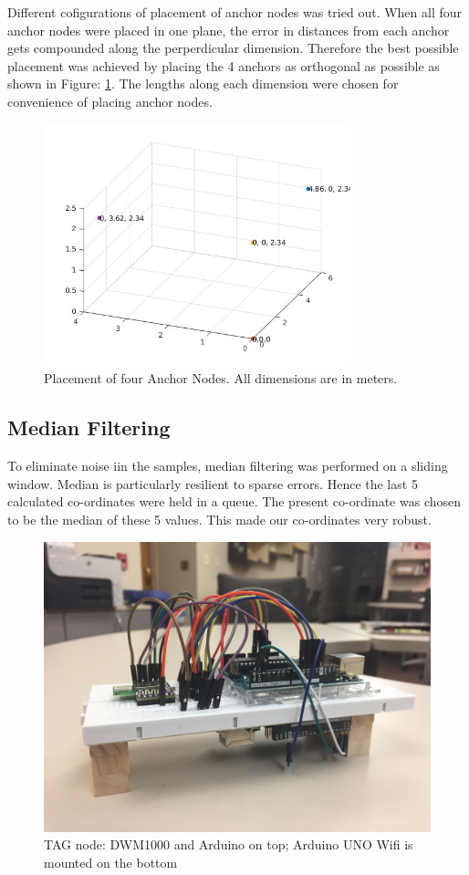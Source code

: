 \documentclass[journal,transmag]{IEEEtran}
\begin{document}
Different cofigurations of placement of anchor nodes was tried out. When all four anchor nodes were placed in one plane, the error in distances from each anchor gets compounded along the perperdicular dimension. Therefore the best possible placement was achieved by placing the 4 anchors as orthogonal as possible as shown in Figure: \ref{anchorplacement}. The lengths along each dimension were chosen for convenience of placing anchor nodes.


\begin{figure}[!h]
\centering
\includegraphics[width=3.5in]{anchorplacements3d.jpg}
\caption{{Placement of four Anchor Nodes. All dimensions are in meters.}}
\label{anchorplacement}
\end{figure}



\subsection{Median Filtering}

To eliminate noise iin the samples, median filtering was performed on a sliding window. Median is particularly resilient to sparse errors. Hence the last 5 calculated co-ordinates were held in a queue. The present co-ordinate was chosen to be the median of these 5 values. This made our co-ordinates very robust.


\begin{figure}[!h]
\centering
\includegraphics[scale=0.075]{tagnode.JPG}
\caption{{TAG node: DWM1000 and Arduino on top; Arduino UNO Wifi is mounted on the bottom}}
\label{fig:tagnode}
\end{figure}
\end{document}
